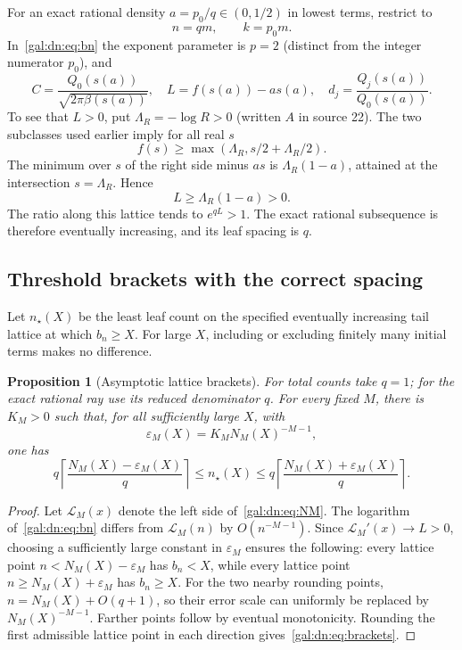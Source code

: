 \documentclass[11pt,letterpaper]{article}
\numberwithin{equation}{section}
\newtheorem{proposition}[theorem]{Proposition}
\theoremstyle{definition}\newtheorem{definition}[theorem]{Definition}
\theoremstyle{remark}\newtheorem{remark}[theorem]{Remark}
\newcommand{\eps}{\varepsilon}
\begin{document}
For an exact rational density $a=p_0/q\in(0,1/2)$ in lowest terms, restrict to
\[
 n=qm,\qquad k=p_0m.
\]
In~\eqref{gal:dn:eq:bn} the exponent parameter is $p=2$ (distinct from the integer numerator $p_0$), and
\begin{equation}\label{gal:dn:eq:rayparams}
 C=\frac{Q_0(s(a))}{\sqrt{2\pi\beta(s(a))}},\quad
 L=f(s(a))-a s(a),\quad d_j=\frac{Q_j(s(a))}{Q_0(s(a))}.
\end{equation}
To see that $L>0$, put $\Lambda_R=-\log R>0$ (written $A$ in source 22). The two subclasses used earlier imply for all real $s$
\[
 f(s)\geq\max(\Lambda_R,s/2+\Lambda_R/2).
\]
The minimum over $s$ of the right side minus $as$ is $\Lambda_R(1-a)$, attained at the intersection $s=\Lambda_R$. Hence
\begin{equation}\label{gal:dn:eq:Lpositive}
 L\geq \Lambda_R(1-a)>0.
\end{equation}
The ratio along this lattice tends to $e^{qL}>1$. The exact rational subsequence is therefore eventually increasing, and its leaf spacing is $q$.

\subsection{Threshold brackets with the correct spacing}
Let $n_\star(X)$ be the least leaf count on the specified eventually increasing tail lattice at which $b_n\geq X$. For large $X$, including or excluding finitely many initial terms makes no difference.
\begin{proposition}[Asymptotic lattice brackets]\label{gal:dn:prop:brackets}
For total counts take $q=1$; for the exact rational ray use its reduced denominator $q$. For every fixed $M$, there is $K_M>0$ such that, for all sufficiently large $X$, with
\[
 \eps_M(X)=K_M N_M(X)^{-M-1},
\]
one has
\begin{equation}\label{gal:dn:eq:brackets}
 q\left\lceil\frac{N_M(X)-\eps_M(X)}q\right\rceil
 \leq n_\star(X)\leq
 q\left\lceil\frac{N_M(X)+\eps_M(X)}q\right\rceil.
\end{equation}
\end{proposition}
\begin{proof}
Let $\mathcal L_M(x)$ denote the left side of~\eqref{gal:dn:eq:NM}. The logarithm of~\eqref{gal:dn:eq:bn} differs from $\mathcal L_M(n)$ by $O(n^{-M-1})$. Since $\mathcal L_M'(x)\to L>0$, choosing a sufficiently large constant in $\eps_M$ ensures the following: every lattice point $n<N_M(X)-\eps_M$ has $b_n<X$, while every lattice point $n\geq N_M(X)+\eps_M$ has $b_n\geq X$. For the two nearby rounding points, $n=N_M(X)+O(q+1)$, so their error scale can uniformly be replaced by $N_M(X)^{-M-1}$. Farther points follow by eventual monotonicity. Rounding the first admissible lattice point in each direction gives~\eqref{gal:dn:eq:brackets}.
\end{proof}
\end{document}
